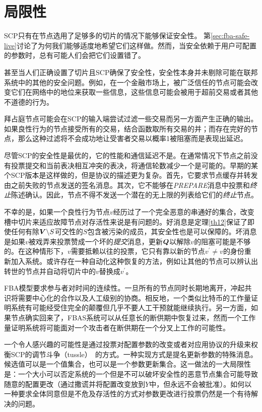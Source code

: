 \section{局限性}\label{sec:limit}

SCP只有在节点选用了足够多的{\quorum}切片的情况下能够保证安全性。	第\ref{sec:fba-safe-live}讨论了为何我们能够适度地希望它们这样做。然而，当安全依赖于用户可配置的参数时，总有可能人们会把它们设置错了。

甚至当人们正确设置了{\quorum}切片且SCP确保了安全性，安全性本身并未剔除可能在联邦系统中的其他的安全问题。例如，在一个金融市场上，被广泛信任的节点可能会改变它们在网络中的地位来获取一些信息，这些信息可能会被用于超前交易或者其他不道德的行为。

拜占庭节点可能会在SCP的输入端尝试过滤一些交易而另一方面产生正确的输出。如果良性行为的节点接受所有的交易，结合函数取所有交易的并；而存在完好的节点，那么这种过滤将不会成功地让受害者交易以概率1被阻塞而是表现出延迟。

尽管SCP的安全性是最优的，它的性能和通信延迟不是。在通常情况下节点之前没有投票提交和当前表决相互冲突的表决，将通信轮数减少一个是可能的。早期的某个SCP版本是这样做的，但是协议的描述更为复杂。首先，它要求节点缓存并转发由之前失败的节点发送的签名消息。其次，它不能够在\textsl{PREPARE}消息中投票和\textit{终止}陈述确认。因此，节点不得不发送一个潜在的无上限的列表给它们的\textit{终止}节点。

不幸的是，如果一个良性行为节点$v$经历过了一个完全恶意的串通好的{\vblock}集合，改变槽中切片来适应故障节点对存活性来说是有问题的。好消息是定理\ref{th12}保证了即使任何有除${\bm V}\backslash S${\quorum}可交性的$S$包含被污染的成员，其安全性也是可以保障的。坏消息是如果$v$被戏弄来投票赞成一个坏的\textit{提交}消息，更新${\bm Q}$以解除$v$的阻塞可能是不够的。在这种情形下，$v$需要抵赖以往的投票，它只有靠以新的节点$v^{\prime}\neq v$的身份重新加入系统。或许存在一种自动化这种恢复的方法，例如让其他的节点可以辨认出转世的节点并自动将切片中的$v$替换成$v^{\prime}$。

FBA模型要求参与者对时间的连续性。一旦所有的节点同时长期地离开，冲起共识将需要中心化的合作以及人工级别的协商。相反地，一个类似比特币的工作量证明系统有可能经受住完全的颠覆但几乎不要人工干预就能继续执行。另一方面，如果节点确实回来了，FBAS系统可以从任意长的断供期中恢复过来，然而一个工作量证明系统将可能面对一个攻击者在断供期在一个分叉上工作的可能性。

一个令人感兴趣的可能性是通过投票对配置参数的改变或者对应用协议的升级来权衡SCP的调节斗争（tussle）~\cite{Clark:2005:TCD:1074047.1074049}的方式。一种实现方式是提名更新参数的特殊消息。候选值可以是一个值集合，也可以是一个参数更新集合。这一做法的一大局限性是：一个大小可以否定系统的一个{\quorum}但是不可以破坏安全性的恶意节点集合可能导致随意的配置更改（通过撒谎并将配置改变放到$Y$中，但永远不会被批准）。如何以一种要求全体{\quorum}同意但是不危及存活性的方式对参数更改进行投票仍然是一个有待解决的问题。